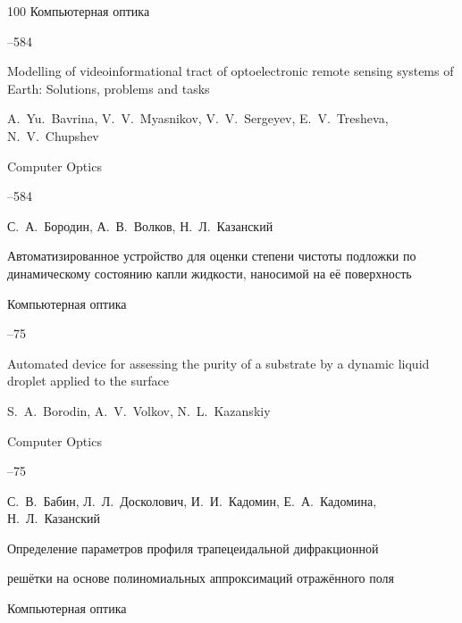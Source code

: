 \begin{thebibliography}{100}
\jour Компьютерная оптика




--584

\misctransl

\paper Modelling of videoinformational tract of optoelectronic remote sensing systems of Earth: Solutions, problems and tasks

\by A.~Yu.~Bavrina, V.~V.~Myasnikov, V.~V.~Sergeyev, E.~V.~Tresheva, N.~V.~Chupshev

\jour Computer Optics




--584






\by С.~А.~Бородин, А.~В.~Волков, Н.~Л.~Казанский

\paper Автоматизированное устройство для оценки степени чистоты подложки  по динамическому состоянию капли жидкости, наносимой на её поверхность

\jour Компьютерная оптика



--75

\misctransl

\paper Automated device for assessing the purity of a substrate by a dynamic liquid droplet applied to the surface

\by S.~A.~Borodin, A.~V.~Volkov, N.~L.~Kazanskiy

\jour Computer Optics



--75






\by С.~В.~Бабин, Л.~Л.~Досколович, И.~И.~Кадомин, Е.~А.~Кадомина, Н.~Л.~Казанский

\paper Определение параметров профиля трапецеидальной дифракционной

решётки на основе полиномиальных аппроксимаций отражённого поля

\jour Компьютерная оптика


\end{thebibliography}

